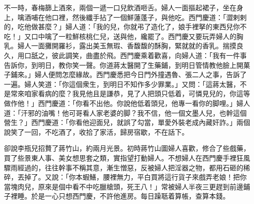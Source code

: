 不一時，春梅篩上酒來，兩個一遞一口兒飲酒咂舌。婦人一面摳起裙子，坐在身上，噙酒哺在他口裡，然後纖手拈了一個鮮蓮蓬子，{}與他吃。西門慶道：「澀剌剌的，{}吃他做甚麼？」婦人道：「我的兒，你就弔了造化了，娘手裡拏的東西兒你不吃！」又口中噙了一粒鮮核桃仁兒，{}送與他，纔罷了。西門慶又要玩弄婦人的胸乳。婦人一面攤開羅衫，露出美玉無瑕、香馥馥的酥胸，緊就就的香乳。揣摸良久，用口舐之，彼此調笑，曲盡於飛。西門慶乘着歡喜，向婦人道：「我有一件事告訴你，到明日，教你笑一聲。你道蔣太醫開了生藥鋪，到明日管情教他臉上開菓子鋪來。」婦人便問怎麼緣故。西門慶悉把今日門外撞遇魯、張二人之事，告訴了一遍。婦人笑道：「你這個衆生，到明日不知作多少罪業。」又問：「這蔣太醫，不是常來咱家看病的麼？我見他且是謙恭，見了人把頭只低着，可憐見兒的，你這等做作他！」西門慶道：「你看不出他。你說他低着頭兒，他專一看你的脚哩。」婦人道：「汗邪的油嘴！他可哥看人家老婆的脚？我不信，他一個文墨人兒，{}也幹這個營生？」{}西門慶道：「你看他迎面兒，就誤了勾當，單愛外裝老成內藏奸詐。」兩個說笑了一回，不吃酒了，收拾了家活，歸房宿歇，不在話下。

卻說李瓶兒招贅了蔣竹山，約兩月光景。初時蔣竹山圖婦人喜歡，修合了些戲藥，買了些景東人事、美女想思套之類，實指望打動婦人。不想婦人在西門慶手裡狂風驟雨經過的，往往幹事不稱其意，漸生憎惡，反被婦人把淫器之物，都用石砸的稀碎，丟掉了。{}又說：「你本蝦鱔，腰裡無力，{}平白買將這行貨子來戲弄老娘！把你當塊肉兒，原來是個中看不中吃臘槍頭，死王八！」常被婦人半夜三更趕到前邊鋪子裡睡。於是一心只想西門慶，不許他進房。每日躁聒着算帳，查算本錢。

